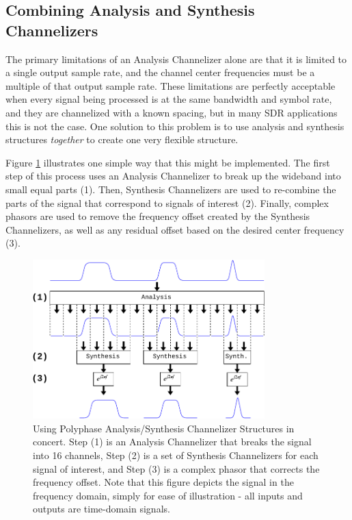 \documentclass[12pt]{report}
\begin{document}
\subsection{Combining Analysis and Synthesis Channelizers}
\label{sec:combine_analysis_synthesis}
The primary limitations of an Analysis Channelizer alone are that it is limited
to a single output sample rate, and the channel center frequencies must be
a multiple of that output sample rate. These limitations are perfectly
acceptable when every signal being processed is at the same bandwidth and
symbol rate, and they are channelized with a known spacing, but in many SDR
applications this is not the case. One solution to this problem is to use
analysis and synthesis structures \emph{together} to create one very flexible
structure.

Figure \ref{fig:analysis_and_synthesis} illustrates one simple way that this
might be implemented. The first step of this process uses an Analysis
Channelizer to break up the wideband into small equal parts (1). Then,
Synthesis Channelizers are used to re-combine the parts of the signal that
correspond to signals of interest (2). Finally, complex phasors are used to
remove the frequency offset created by the Synthesis Channelizers, as well as
any residual offset based on the desired center frequency (3).

\begin{figure}[h!]
    \begin{center}
    \includegraphics[width=0.8\textwidth]{polyphase}%
    \end{center}
    \caption{
Using Polyphase Analysis/Synthesis Channelizer Structures in concert. Step (1)
is an Analysis Channelizer that breaks the signal into 16 channels, Step (2) is
a set of Synthesis Channelizers for each signal of interest, and Step (3) is
a complex phasor that corrects the frequency offset. Note that this figure
depicts the signal in the frequency domain, simply for ease of illustration -
all inputs and outputs are time-domain signals.
    }
    \label{fig:analysis_and_synthesis}
\end{figure}
\end{document}
